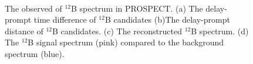 \begin{figure}[h!]
\centering
{}\quad
{} \\
\caption[The observed of $^{12}$B spectrum in PROSPECT]{The observed of $^{12}$B spectrum in PROSPECT. (a) The delay-prompt time difference of $^{12}$B candidates  (b)The delay-prompt distance of $^{12}$B candidates. (c) The reconstructed $^{12}$B spectrum. (d) The $^{12}$B signal spectrum (pink) compared to the background spectrum (blue).}
\label{fig:B12plots}
\end{figure}

